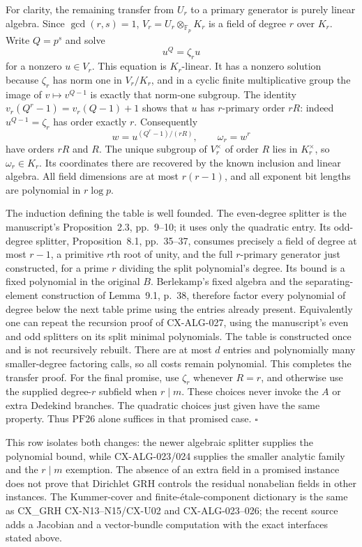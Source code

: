 \documentclass[11pt,a4paper]{article}
\begin{document}
For clarity, the remaining transfer from $U_r$ to a primary
generator is purely linear algebra. Since $\gcd(r,s)=1$,
$V_r=U_r\otimes_{\mathbb F_p}K_r$ is a field of degree $r$
over $K_r$. Write $Q=p^s$ and solve
\[
                      u^Q=\zeta_r u
\]
for a nonzero $u\in V_r$. This equation is $K_r$-linear.
It has a nonzero solution because $\zeta_r$ has norm one in
$V_r/K_r$, and in a cyclic finite multiplicative group the image
of $v\mapsto v^{Q-1}$ is exactly that norm-one subgroup.
The identity
$v_r(Q^r-1)=v_r(Q-1)+1$ shows that $u$ has $r$-primary
order $rR$: indeed $u^{Q-1}=\zeta_r$ has order exactly $r$.
Consequently
\[
             w=u^{(Q^r-1)/(rR)},\qquad\omega_r=w^r
\]
have orders $rR$ and $R$. The unique subgroup of $V_r^\times$
of order $R$ lies in $K_r^\times$, so $\omega_r\in K_r$.
Its coordinates there are recovered by the known inclusion and
linear algebra. All field dimensions are at most $r(r-1)$,
and all exponent bit lengths are polynomial in $r\log p$.

The induction defining the table is well founded. The even-degree
splitter is the manuscript's Proposition~2.3, pp.~9--10; it
uses only the quadratic entry. Its odd-degree splitter,
Proposition~8.1, pp.~35--37, consumes precisely a field of
degree at most $r-1$, a primitive $r$th root of unity, and the
full $r$-primary generator just constructed, for a prime
$r$ dividing the split polynomial's degree. Its bound is a fixed
polynomial in the original $B$. Berlekamp's fixed algebra and
the separating-element construction of Lemma~9.1, p.~38,
therefore factor every polynomial of degree below the next table
prime using the entries already present. Equivalently one can
repeat the recursion proof of CX-ALG-027, using the manuscript's
even and odd splitters on its split minimal polynomials. The
table is constructed once and is not recursively rebuilt. There
are at most $d$ entries and polynomially many smaller-degree
factoring calls, so all costs remain polynomial. This completes
the transfer proof. For the final promise, use $\zeta_r$ whenever
$R=r$, and otherwise use the supplied degree-$r$ subfield when
$r\mid m$. These choices never invoke the $A$ or extra Dedekind
branches. The quadratic choices just given have the same property.
Thus $\mathrm{PF26}$ alone suffices in that promised case.
\hfill$\square$

This row isolates both changes: the newer algebraic splitter supplies
the polynomial bound, while CX-ALG-023/024 supplies the smaller
analytic family and the $r\mid m$ exemption. The absence of an
extra field in a promised instance does not prove that Dirichlet GRH
controls the residual nonabelian fields in other instances. The
Kummer-cover and finite-\'etale-component dictionary is the same as
CX\_GRH CX-N13--N15/CX-U02 and CX-ALG-023--026; the recent source
adds a Jacobian and a vector-bundle computation with the exact
interfaces stated above.
\end{document}
